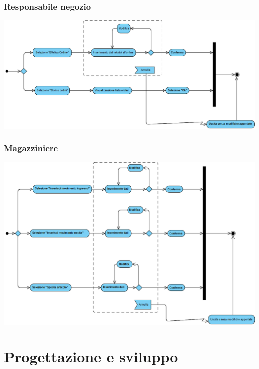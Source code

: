 \documentclass[a4paper]{article}
\begin{document}
\subsubsection{Responsabile negozio}
\begin{center}
\begin{changemargin}{-1.5cm}{-0.5cm} 
	\includegraphics [scale=0.5] {ActivityDiagram_ResponsabileNegozio}
\end{changemargin} 
\end{center}

\subsubsection{Magazziniere}
\begin{center}
	\begin{changemargin}{-1.5cm}{-0.5cm} 
		\includegraphics [scale=0.5]  {ActivityDiagram_Magazziniere}
	\end{changemargin} 
\end{center}

\section{Progettazione e sviluppo}
\end{document}
